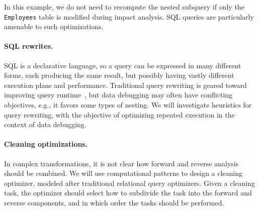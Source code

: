 \noindent
In this example, we do not need to recompute the nested subquery if
only the \texttt{Employees} table is modified during impact
analysis. SQL queries are particularly amenable to such optimizations.

\paragraph{SQL rewrites.} %
\label{par:sql_rewrites}
SQL is a declarative language, so a query can be expressed in many
different forms, each producing the same result, but possibly having
vastly different execution plans and performance. 
Traditional query rewriting is geared toward improving query
runtime~\cite{DBLP:conf/sigmod/PiraheshHH92}, but data debugging may
often have conflicting objectives, e.g., it favors some types of
nesting. We will investigate heuristics for query rewriting, with the
objective of optimizing repeated execution in the context of data
debugging.


\paragraph{Cleaning optimizations.} %
\label{par:cleaning_optimizations}
In complex transformations, it is not clear how forward and reverse analysis
should be combined. We will use computational patterns to design a cleaning
optimizer, modeled after traditional relational query optimizers. Given a
cleaning task, the optimizer should select how to subdivide the task into the
forward and reverse components, and in which order the tasks should be
performed.

